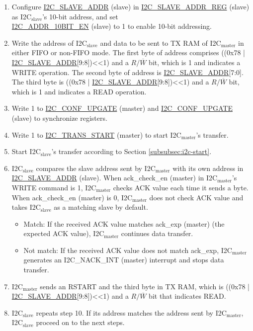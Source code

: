 \documentclass[main\_\_EN.tex]{subfiles}
\begin{document}
\begin{enumerate}
\item Configure \hyperref[fielddesc:I2CSLAVEADDR]{I2C\_SLAVE\_ADDR} (slave) in \hyperref[regdesc:I2CSLAVEADDRREG]{I2C\_SLAVE\_ADDR\_REG} (slave) as I2C$_\text{slave}$'s 10-bit address, and set \\\hyperref[fielddesc:I2CADDR10BITEN]{I2C\_ADDR\_10BIT\_EN} (slave) to 1 to enable 10-bit addressing.
\item Write the address of I2C$_\text{slave}$ and data to be sent to TX RAM of I2C$_\text{master}$ in either FIFO or non-FIFO mode. The first byte of address comprises ((0x78 | \hyperref[fielddesc:I2CSLAVEADDR]{I2C\_SLAVE\_ADDR}[9:8])<<1) and a $R/\overline W$ bit, which is 1 and indicates a WRITE operation. The second byte of address is \hyperref[fielddesc:I2CSLAVEADDR]{I2C\_SLAVE\_ADDR}[7:0]. The third byte is ((0x78 | \hyperref[fielddesc:I2CSLAVEADDR]{I2C\_SLAVE\_ADDR}[9:8])<<1) and a $R/\overline W$ bit, which is 1 and indicates a READ operation.

\item Write 1 to \hyperref[fielddesc:I2CCONFUPGATE]{I2C\_CONF\_UPGATE} (master) and \hyperref[fielddesc:I2CCONFUPGATE]{I2C\_CONF\_UPGATE} (slave) to synchronize registers.
\item Write 1 to \hyperref[fielddesc:I2CTRANSSTART]{I2C\_TRANS\_START} (master) to start I2C$_\text{master}$'s transfer.
\item Start I2C$_\text{slave}$'s transfer according to Section \ref{subsubsec:i2c-start}.
\item I2C$_\text{slave}$ compares the slave address sent by I2C$_\text{master}$ with its own address in \hyperref[fielddesc:I2CSLAVEADDR]{I2C\_SLAVE\_ADDR} (slave). When ack\_check\_en (master) in I2C$_\text{master}$'s WRITE command is 1, I2C$_\text{master}$ checks ACK value each time it sends a byte. When ack\_check\_en (master) is 0, I2C$_\text{master}$ does not check ACK value and takes I2C$_\text{slave}$ as a matching slave by default.
\begin{itemize}
\item Match: If the received ACK value matches ack\_exp (master) (the expected ACK value), I2C$_\text{master}$ continues data transfer.
\item Not match: If the received ACK value does not match ack\_exp, I2C$_\text{master}$ generates an I2C\_NACK\_INT (master) interrupt and stops data transfer.
\end{itemize}

\item I2C$_\text{master}$ sends an RSTART and the third byte in TX RAM, which is ((0x78 | \hyperref[fielddesc:I2CSLAVEADDR]{I2C\_SLAVE\_ADDR}[9:8])<<1) and a $R/\overline W$ bit that indicates READ.
\item I2C$_\text{slave}$ repeats step 10. If its address matches the address sent by I2C$_\text{master}$, I2C$_\text{slave}$ proceed on to the next steps.


\end{enumerate}
\end{document}
